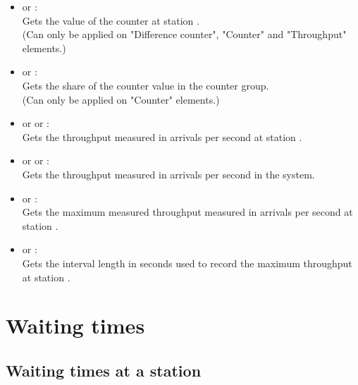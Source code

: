 \begin{itemize}

\item
{} or :\\
Gets the value of the counter at station .\\
(Can only be applied on "Difference counter", "Counter" and "Throughput" elements.)

\item
{} or :\\
Gets the share of the counter value in the counter group.\\
(Can only be applied on "Counter" elements.)

\item
{} or  or :\\
Gets the throughput measured in arrivals per second at station .

\item
{} or  or :\\
Gets the throughput measured in arrivals per second in the system.

\item
{} or :\\
Gets the maximum measured throughput measured in arrivals per second at station .

\item
{} or :\\
Gets the interval length in seconds used to record the maximum throughput at station .

\end{itemize}  



\section{Waiting times}



\subsection{Waiting times at a station}


